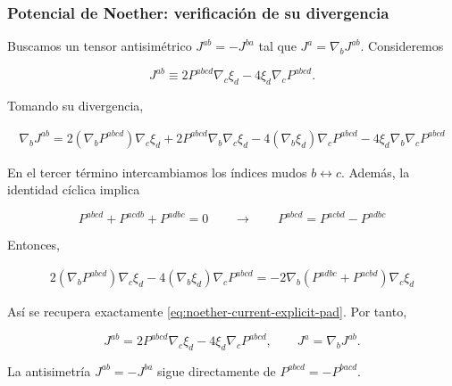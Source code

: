 \documentclass{beamer}
\newcommand{\Eq}[1]{\eqref{#1}}
\begin{document}
\begin{frame}[label=nav-frame-045]
\frametitle{Potencial de Noether: verificación de su divergencia}
	\scriptsize

	Buscamos un tensor antisimétrico \(J^{ab}=-J^{ba}\) tal que $	J^a=\nabla_bJ^{ab}$. Consideremos

	\[
	J^{ab}
	\equiv
	2P^{abcd}\nabla_c\xi_d
	-
	4\xi_d\nabla_cP^{abcd}.
	\]


	Tomando su divergencia,

	\[
	\begin{aligned}
		\nabla_bJ^{ab}
		=
		2(\nabla_bP^{abcd})\nabla_c\xi_d
		+
		2P^{abcd}\nabla_b\nabla_c\xi_d
		-
		4(\nabla_b\xi_d)\nabla_cP^{abcd}
		-
		4\xi_d\nabla_b\nabla_cP^{abcd}
	\end{aligned}
	\]


	En el tercer término intercambiamos los índices mudos
	\(b\leftrightarrow c\). Además, la identidad cíclica implica

	\[
	P^{abcd}+P^{acdb}+P^{adbc}=0
	\qquad \longrightarrow \qquad
	P^{abcd}
	=
	P^{acbd}-P^{adbc}
	\]

	Entonces,

	\[
	\begin{aligned}
		2(\nabla_bP^{abcd})\nabla_c\xi_d
		-
		4(\nabla_b\xi_d)\nabla_cP^{abcd}
		=
		-2\nabla_b
		\left(
		P^{adbc}+P^{acbd}
		\right)\nabla_c\xi_d
	\end{aligned}
	\]

	Así se recupera exactamente
	\Eq{eq:noether-current-explicit-pad}. Por tanto,

	\begin{equation}
		\boxed{
			J^{ab}
			=
			2P^{abcd}\nabla_c\xi_d
			-
			4\xi_d\nabla_cP^{abcd},
			\qquad
			J^a=\nabla_bJ^{ab}.
		}
		\label{eq:noether-potential-pad}
	\end{equation}

	La antisimetría \(J^{ab}=-J^{ba}\) sigue directamente de
	\(P^{abcd}=-P^{bacd}\).

\end{frame}
\end{document}
